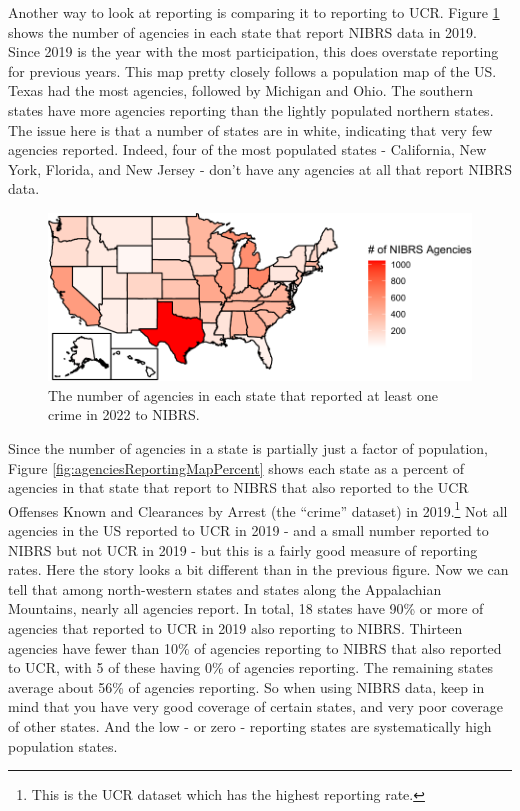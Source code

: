 \documentclass[
  12pt,
  openany]{book}
\begin{document}
Another way to look at reporting is comparing it to reporting to UCR. Figure \ref{fig:agenciesReportingMap} shows the number of agencies in each state that report NIBRS data in 2019. Since 2019 is the year with the most participation, this does overstate reporting for previous years. This map pretty closely follows a population map of the US. Texas had the most agencies, followed by Michigan and Ohio. The southern states have more agencies reporting than the lightly populated northern states. The issue here is that a number of states are in white, indicating that very few agencies reported. Indeed, four of the most populated states - California, New York, Florida, and New Jersey - don't have any agencies at all that report NIBRS data.

\begin{figure}

{\centering \includegraphics[width=0.9\linewidth]{11_nibrs_general_files/figure-latex/agenciesReportingMap-1} 

}

\caption{The number of agencies in each state that reported at least one crime in 2022 to NIBRS.}\label{fig:agenciesReportingMap}
\end{figure}

Since the number of agencies in a state is partially just a factor of population, Figure \ref{fig:agenciesReportingMapPercent} shows each state as a percent of agencies in that state that report to NIBRS that also reported to the UCR Offenses Known and Clearances by Arrest (the ``crime'' dataset) in 2019.\footnote{This is the UCR dataset which has the highest reporting rate.} Not all agencies in the US reported to UCR in 2019 - and a small number reported to NIBRS but not UCR in 2019 - but this is a fairly good measure of reporting rates. Here the story looks a bit different than in the previous figure. Now we can tell that among north-western states and states along the Appalachian Mountains, nearly all agencies report. In total, 18 states have 90\% or more of agencies that reported to UCR in 2019 also reporting to NIBRS. Thirteen agencies have fewer than 10\% of agencies reporting to NIBRS that also reported to UCR, with 5 of these having 0\% of agencies reporting. The remaining states average about 56\% of agencies reporting. So when using NIBRS data, keep in mind that you have very good coverage of certain states, and very poor coverage of other states. And the low - or zero - reporting states are systematically high population states.
\end{document}
